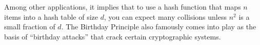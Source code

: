 Among other applications, it implies that to use a hash function that
maps $n$ items into a hash table of size $d$, you can expect many
collisions unless $n^2$ is a small fraction of $d$.  The Birthday
Principle also famously comes into play as the basis of ``birthday
attacks'' that crack certain cryptographic systems.
\fi

\begin{problems}

\examproblems
{}

\classproblems
{}

\homeworkproblems
{}

\end{problems}

